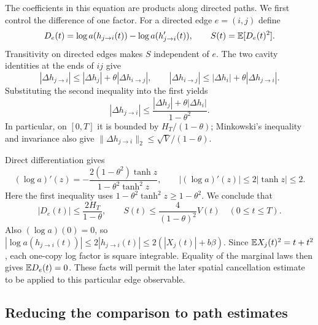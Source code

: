 The coefficients in this equation are products along directed paths.
We first control the difference of one factor. For a directed edge
$e=(i,j)$ define
\begin{equation}\label{eq:log-discrepancy-def}
 D_e(t)=\log a(h_{j\to i}(t))-
        \log a(h'_{j\to i}(t)),
 \qquad S(t)=\mathbb E[D_e(t)^2].
\end{equation}
Transitivity on directed edges makes $S$ independent of $e$.
The two cavity identities at the ends of $ij$ give
\[
 |\Delta h_{j\to i}|
     \le|\Delta h_j|+\theta|\Delta h_{i\to j}|,
 \qquad
 |\Delta h_{i\to j}|
     \le|\Delta h_i|+\theta|\Delta h_{j\to i}|.
\]
Substituting the second inequality into the first yields
\begin{equation}\label{eq:component-difference}
 |\Delta h_{j\to i}|
  \le\frac{|\Delta h_j|+\theta|\Delta h_i|}{1-\theta^2}.
\end{equation}
In particular, on $[0,T]$ it is bounded by $H_T/(1-\theta)$;
Minkowski's inequality and invariance also give
$\|\Delta h_{j\to i}\|_2\le\sqrt V/(1-\theta)$.

Direct differentiation gives
\begin{equation}\label{eq:log-derivative}
 (\log a)'(z)
   =-\frac{2(1-\theta^2)\tanh z}{1-\theta^2\tanh^2z},
 \qquad |(\log a)'(z)|\le2|\tanh z|\le2.
\end{equation}
Here the first inequality uses
$1-\theta^2\tanh^2z\ge1-\theta^2$. We conclude that
\begin{equation}\label{eq:basic-log-loss}
 |D_e(t)|\le\frac{2H_T}{1-\theta},
 \qquad S(t)\le\frac{4}{(1-\theta)^2}V(t)
       \quad(0\le t\le T).
\end{equation}
Also $(\log a)(0)=0$, so
$|\log a(h_{j\to i}(t))|\le2|h_{j\to i}(t)|
\le2(|X_j(t)|+b\beta)$. Since $\mathbb E X_j(t)^2=t+t^2$, each one-copy
log factor is square integrable. Equality of the marginal laws then
gives $\mathbb E D_e(t)=0$. These facts will permit the later spatial
cancellation estimate to be applied to this particular edge observable.

\subsection{Reducing the comparison to path estimates}

